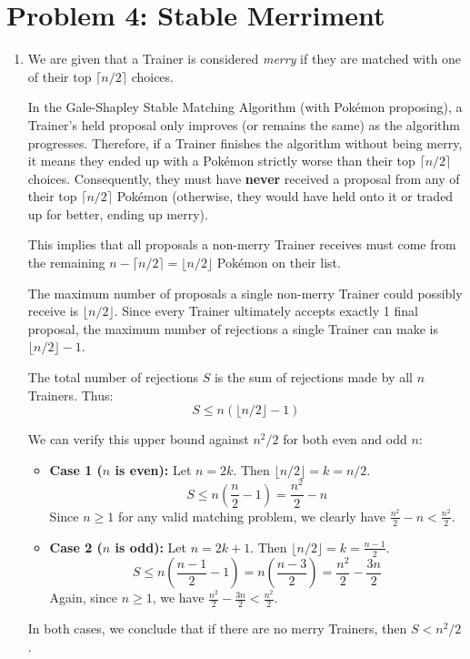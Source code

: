 \documentclass[11pt]{article}
\begin{document}
\section*{Problem 4: Stable Merriment}
\begin{enumerate}[label=\textbf{(\alph*)}]
    \item We are given that a Trainer is considered \textit{merry} if they are matched with one of their top $\lceil n/2 \rceil$ choices.
    
    In the Gale-Shapley Stable Matching Algorithm (with Pokémon proposing), a Trainer's held proposal only improves (or remains the same) as the algorithm progresses. Therefore, if a Trainer finishes the algorithm without being merry, it means they ended up with a Pokémon strictly worse than their top $\lceil n/2 \rceil$ choices. Consequently, they must have \textbf{never} received a proposal from any of their top $\lceil n/2 \rceil$ Pokémon (otherwise, they would have held onto it or traded up for better, ending up merry).
    
    This implies that all proposals a non-merry Trainer receives must come from the remaining $n - \lceil n/2 \rceil = \lfloor n/2 \rfloor$ Pokémon on their list. 
    
    The maximum number of proposals a single non-merry Trainer could possibly receive is $\lfloor n/2 \rfloor$. Since every Trainer ultimately accepts exactly 1 final proposal, the maximum number of rejections a single Trainer can make is $\lfloor n/2 \rfloor - 1$.
    
    The total number of rejections $S$ is the sum of rejections made by all $n$ Trainers. Thus:
    $$S \le n(\lfloor n/2 \rfloor - 1)$$
    
    We can verify this upper bound against $n^2/2$ for both even and odd $n$:
    \begin{itemize}
        \item \textbf{Case 1 ($n$ is even):} Let $n = 2k$. Then $\lfloor n/2 \rfloor = k = n/2$. 
        $$S \le n\left(\frac{n}{2} - 1\right) = \frac{n^2}{2} - n$$
        Since $n \ge 1$ for any valid matching problem, we clearly have $\frac{n^2}{2} - n < \frac{n^2}{2}$.
        
        \item \textbf{Case 2 ($n$ is odd):} Let $n = 2k + 1$. Then $\lfloor n/2 \rfloor = k = \frac{n-1}{2}$.
        $$S \le n\left(\frac{n-1}{2} - 1\right) = n\left(\frac{n-3}{2}\right) = \frac{n^2}{2} - \frac{3n}{2}$$
        Again, since $n \ge 1$, we have $\frac{n^2}{2} - \frac{3n}{2} < \frac{n^2}{2}$.
    \end{itemize}
    In both cases, we conclude that if there are no merry Trainers, then $S < n^2/2$.


\end{enumerate}
\end{document}

